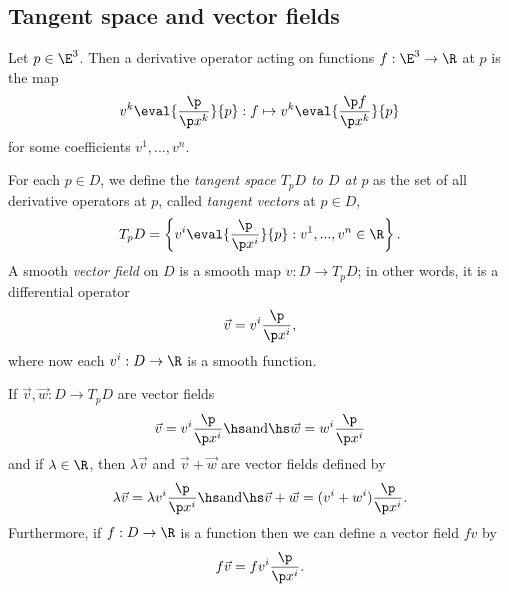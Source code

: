 \documentclass{article}
\begin{document}
\subsection{Tangent space and vector fields}

\begin{definition}
    Let $p\in\E^3$. Then a derivative operator acting on functions $f:\E^3\to\R$
    at $p$ is the map
    \begin{align*}
        v^k \eval{\frac{\p }{\p x^k}}{p} : 
        f \mapsto v^k \eval{\frac{\p f}{\p x^k}}{p}    
    \end{align*}
    for some coefficients $v^1,...,v^n$.
\end{definition}

\begin{definition}
    For each $p\in D$, we define the \emph{tangent space $T_pD$ to $D$ at $p$} as the
    set of all derivative operators at $p$, called \emph{tangent vectors} at $p\in D$,
    \begin{align*}
        T_p D =\left\lbrace v^i \eval{\frac{\p}{\p x^i}}{p}: v^1,...,v^n\in\R\right\rbrace.
    \end{align*}
    A smooth \emph{vector field} on $D$ is a smooth map $v:D\to T_pD$; in other words,
    it is a differential operator
    \begin{align*}
        \vec v = v^i\frac{\p}{\p x^i},
    \end{align*}
    where now each $v^i:D\to\R$ is a smooth function.
\end{definition}

\begin{definition}
    If $\vec v,\vec w:D\to T_pD$ are vector fields
    \begin{align*}
        \vec v = v^i \frac{\p}{\p x^i}\hs\text{and}\hs \vec w = w^i \frac{\p }{\p x^i}
    \end{align*}
    and if $\lambda\in\R$, then $\lambda \vec v$ and $\vec v+\vec w$ are vector fields defined by
    \begin{align*}
        \lambda \vec v = \lambda v^i \frac{\p }{\p x^i}\hs\text{and}\hs
        \vec v+\vec w = (v^i+w^i)\frac{\p }{\p x^i}.
    \end{align*}
    Furthermore, if $f:D\to\R$ is a function then we can define a vector field
    $fv$ by
    \begin{align*}
        f\vec v = fv^i\frac{\p }{\p x^i}.
    \end{align*}
\end{definition}
\end{document}
